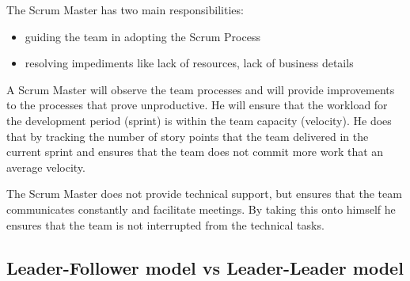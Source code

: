The Scrum Master has two main responsibilities:

\begin{itemize}
\item guiding the team in adopting the Scrum Process
\item resolving impediments like lack of resources, lack of business details
\end{itemize}

A Scrum Master will observe the team processes and will provide improvements to the processes that prove unproductive. He will ensure that the workload for the development period (sprint) is within the team capacity (velocity). He does that by tracking the number of story points that the team delivered in the current sprint and ensures that the team does not commit more work that an average velocity.

The Scrum Master does not provide technical support, but ensures that the team communicates constantly and facilitate meetings. By taking this onto himself he ensures that the team is not interrupted from the technical tasks.

\subsection{Leader-Follower model vs Leader-Leader model}


